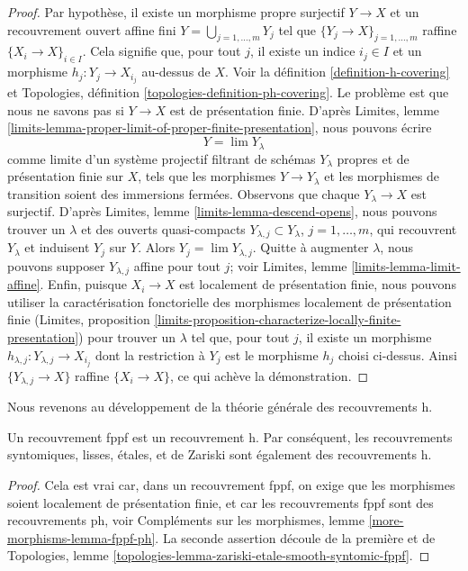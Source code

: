 \begin{proof}
Par hypothèse, il existe un morphisme propre surjectif
$Y \to X$ et un recouvrement ouvert affine fini
$Y = \bigcup_{j = 1, \ldots, m} Y_j$ tel que
$\{Y_j \to X\}_{j = 1, \ldots, m}$ raffine $\{X_i \to X\}_{i \in I}$.
Cela signifie que, pour tout $j$, il existe un indice $i_j \in I$
et un morphisme $h_j : Y_j \to X_{i_j}$ au-dessus de $X$.
Voir la définition \ref{definition-h-covering} et
Topologies, définition \ref{topologies-definition-ph-covering}.
Le problème est que nous ne savons pas si $Y \to X$ est de
présentation finie.
D'après
Limites, lemme \ref{limits-lemma-proper-limit-of-proper-finite-presentation},
nous pouvons écrire
$$
Y = \lim Y_\lambda
$$
comme limite d'un système projectif filtrant de schémas $Y_\lambda$ propres et de présentation finie
sur $X$, tels que les morphismes $Y \to Y_\lambda$ et les
morphismes de transition soient des immersions fermées. Observons que
chaque $Y_\lambda \to X$ est surjectif.
D'après Limites, lemme \ref{limits-lemma-descend-opens},
nous pouvons trouver un $\lambda$ et des ouverts quasi-compacts
$Y_{\lambda, j} \subset Y_\lambda$, $j = 1, \ldots, m$,
qui recouvrent $Y_\lambda$ et induisent $Y_j$ sur $Y$.
Alors $Y_j = \lim Y_{\lambda, j}$.
Quitte à augmenter $\lambda$, nous pouvons supposer $Y_{\lambda, j}$
affine pour tout $j$; voir
Limites, lemme \ref{limits-lemma-limit-affine}.
Enfin, puisque $X_i \to X$ est localement de présentation finie,
nous pouvons utiliser la caractérisation fonctorielle des morphismes
localement de présentation finie
(Limites, proposition
\ref{limits-proposition-characterize-locally-finite-presentation})
pour trouver un $\lambda$ tel que, pour tout $j$, il existe
un morphisme $h_{\lambda, j} : Y_{\lambda, j} \to X_{i_j}$
dont la restriction à $Y_j$ est le morphisme $h_j$ choisi ci-dessus.
Ainsi $\{Y_{\lambda, j} \to X\}$ raffine
$\{X_i \to X\}$, ce qui achève la démonstration.
\end{proof}

\noindent
Nous revenons au développement de la théorie générale des recouvrements h.

\begin{lemma}
\label{lemma-zariski-h}
Un recouvrement fppf est un recouvrement h. Par conséquent, les recouvrements syntomiques, lisses, \'etales,
et de Zariski sont également des recouvrements h.
\end{lemma}

\begin{proof}
Cela est vrai car, dans un recouvrement fppf, on exige que les morphismes soient
localement de présentation finie, et car les recouvrements fppf sont des
recouvrements ph, voir Compléments sur les morphismes,
lemme \ref{more-morphisms-lemma-fppf-ph}.
La seconde assertion découle de la première et de
Topologies, lemme \ref{topologies-lemma-zariski-etale-smooth-syntomic-fppf}.
\end{proof}

